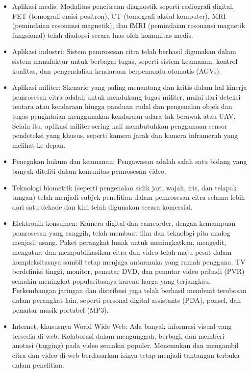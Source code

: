 \documentclass[
  letterpaper,
  DIV=11,
  numbers=noendperiod]{scrreprt}
\begin{document}
\begin{itemize}
\item
  Aplikasi medis: Modalitas pencitraan diagnostik seperti radiografi
  digital, PET (tomografi emisi positron), CT (tomografi aksial
  komputer), MRI (pemindaian resonansi magnetik), dan fMRI (pemindaian
  resonansi magnetik fungsional) telah diadopsi secara luas oleh
  komunitas medis.\\
\item
  Aplikasi industri: Sistem pemrosesan citra telah berhasil digunakan
  dalam sistem manufaktur untuk berbagai tugas, seperti sistem keamanan,
  kontrol kualitas, dan pengendalian kendaraan berpemandu otomatis
  (AGVs).\\
\item
  Aplikasi militer: Skenario yang paling menantang dan kritis dalam hal
  kinerja pemrosesan citra adalah untuk mendukung tugas militer, mulai
  dari deteksi tentara atau kendaraan hingga panduan rudal dan
  pengenalan objek dan tugas pengintaian menggunakan kendaraan udara tak
  berawak atau UAV. Selain itu, aplikasi militer sering kali membutuhkan
  penggunaan sensor pendeteksi yang khusus, seperti kamera jarak dan
  kamera inframerah yang melihat ke depan.
\item
  Penegakan hukum dan keamanan: Pengawasan adalah salah satu bidang yang
  banyak diteliti dalam komunitas pemrosesan video.\\
\item
  Teknologi biometrik (seperti pengenalan sidik jari, wajah, iris, dan
  telapak tangan) telah menjadi subjek penelitian dalam pemrosesan citra
  selama lebih dari satu dekade dan kini telah digunakan secara
  komersial.\\
\item
  Elektronik konsumen: Kamera digital dan camcorder, dengan kemampuan
  pemrosesan yang canggih, telah membuat film dan teknologi pita analog
  menjadi usang. Paket perangkat lunak untuk meningkatkan, mengedit,
  mengatur, dan mempublikasikan citra dan video telah maju pesat dalam
  kompleksitasnya sambil tetap menjaga antarmuka yang ramah pengguna. TV
  berdefinisi tinggi, monitor, pemutar DVD, dan pemutar video pribadi
  (PVR) semakin meningkat popularitasnya karena harga yang terjangkau.
  Perkembangan jaringan dan distribusi juga telah berhasil membuat
  terobosan dalam perangkat lain, seperti personal digital assistants
  (PDA), ponsel, dan pemutar musik portabel (MP3).\\
\item
  Internet, khususnya World Wide Web: Ada banyak informasi visual yang
  tersedia di web. Kolaborasi dalam mengunggah, berbagi, dan memberi
  anotasi (tagging) pada video semakin populer. Menemukan dan mengambil
  citra dan video di web berdasarkan isinya tetap menjadi tantangan
  terbuka dalam penelitian.
\end{itemize}
\end{document}
